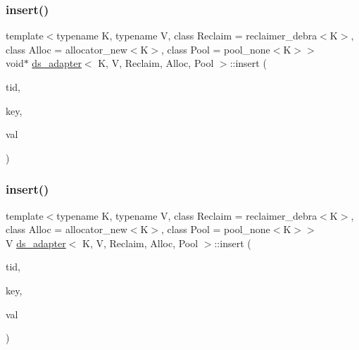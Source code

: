 \subsubsection{\texorpdfstring{insert()}{insert()}\hspace{0.1cm}{\footnotesize\ttfamily [12/26]}}
{\footnotesize\ttfamily template$<$typename K, typename V, class Reclaim = reclaimer\+\_\+debra$<$\+K$>$, class Alloc = allocator\+\_\+new$<$\+K$>$, class Pool = pool\+\_\+none$<$\+K$>$$>$ \\
void$\ast$ \hyperlink{classds__adapter}{ds\+\_\+adapter}$<$ K, V, Reclaim, Alloc, Pool $>$\+::insert (\begin{DoxyParamCaption}\item[{const int}]{tid,  }\item[{const K \&}]{key,  }\item[{const V \&}]{val }\end{DoxyParamCaption})\hspace{0.3cm}{\ttfamily [inline]}}

\mbox{\label{classds__adapter_a6c0fc676d77e30e14946baf325174739}} 
\subsubsection{\texorpdfstring{insert()}{insert()}\hspace{0.1cm}{\footnotesize\ttfamily [13/26]}}
{\footnotesize\ttfamily template$<$typename K, typename V, class Reclaim = reclaimer\+\_\+debra$<$\+K$>$, class Alloc = allocator\+\_\+new$<$\+K$>$, class Pool = pool\+\_\+none$<$\+K$>$$>$ \\
V \hyperlink{classds__adapter}{ds\+\_\+adapter}$<$ K, V, Reclaim, Alloc, Pool $>$\+::insert (\begin{DoxyParamCaption}\item[{const int}]{tid,  }\item[{const K \&}]{key,  }\item[{const V \&}]{val }\end{DoxyParamCaption})\hspace{0.3cm}{\ttfamily [inline]}}

\mbox{\label{classds__adapter_a6c0fc676d77e30e14946baf325174739}} 
